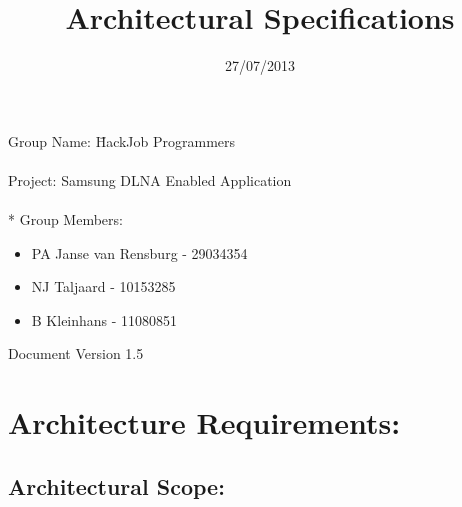 \documentclass[12pt]{article}
\title{Architectural Specifications}
\date{27/07/2013}
\begin{document}
  \maketitle
\begin{tabbing}
Group Name: \= HackJob Programmers
\\~
\\Project: Samsung DLNA Enabled Application
\\~
  \\* Group Members:
\end{tabbing}
	
	\begin{itemize}
	\item PA Janse van Rensburg - 29034354
	\item NJ Taljaard - 10153285
	\item B Kleinhans - 11080851
	\end{itemize}

Document Version 1.5

\newpage
\section{Architecture Requirements:}
\subsection{Architectural Scope:}
\end{document}
